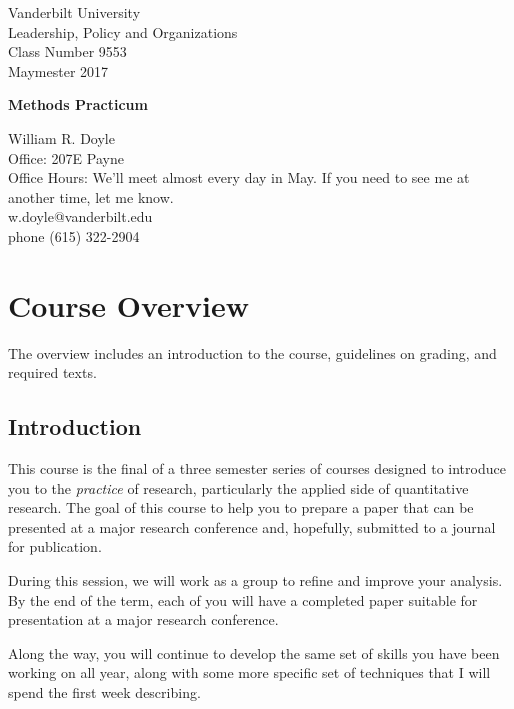 \documentclass[10pt]{article}
\begin{document}


\thispagestyle{empty}%


\setlength{\parskip}{1ex plus 0.5ex minus 0.2ex}

\setcounter{secnumdepth}{-2}



\begin{flushleft}
Vanderbilt University\\Leadership, Policy and Organizations\\Class Number 9553\\ Maymester 2017\\
\end{flushleft}


\begin{center}
\Large{\textbf{Methods Practicum}}\\
\end{center}

\begin{flushleft}
William R. Doyle\\
Office: 207E Payne\\
Office Hours: We'll meet almost every day in May. If you need to see me at another time, let me know.\\
w.doyle@vanderbilt.edu\\
phone (615) 322-2904\\
\end{flushleft}

\section{Course Overview}%

The overview includes an introduction to the course, guidelines on grading, and required texts.

\subsection{Introduction}%
\begin{flushleft}

  This course is the final of a three semester series of courses
  designed to introduce you to the \textit{practice} of research,
  particularly the applied side of quantitative research. The goal of
  this course to help you to prepare a paper that can be presented at
  a major research conference and, hopefully, submitted to a journal
  for publication.


  During this session, we will work as a group to refine and improve
  your analysis. By the end of the term, each of you will have a
  completed paper suitable for presentation at a major research
  conference.

  Along the way, you will continue to develop the same set of skills
  you have been working on all year, along with some more specific
  set of techniques that I will spend the first week describing.


\end{flushleft}
\end{document}
